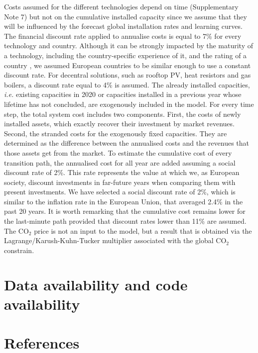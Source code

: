 \documentclass[5p]{elsarticle} %
\begin{document}
Costs assumed for the different technologies depend on time (Supplementary Note 7) but not on the cumulative installed capacity since we assume that they will be influenced by the forecast global installation rates and learning curves. The financial discount rate applied to annualise costs is equal to 7\% for every technology and country. Although it can be strongly impacted by the maturity of a technology, including the country-specific experience of it, and the rating of a country \cite{Egli_2019}, we assumed European countries to be similar enough to use a constant discount rate. For decentral solutions, such as rooftop PV, heat resistors and gas boilers, a discount rate equal to 4\% is assumed. The already installed capacities, \textit{i.e.} existing capacities in 2020 or capacities installed in a previous year whose lifetime has not concluded, are exogenously included in the model. For every time step, the total system cost includes two components. First, the costs of newly installed assets, which exactly recover their investment by market revenues. Second, the stranded costs for the exogenously fixed capacities. They are determined as the difference between the annualised costs and the revenues that those assets get from the market.  To estimate the cumulative cost of every transition path, the annualised cost for all year are added assuming a social discount rate of 2\%. This rate represents the value at which we, as European society, discount investments in far-future years when comparing them with present investments. We have selected a social discount rate of 2\%, which is similar to the inflation rate in the European Union, that averaged 2.4\% in the past 20 years. It is worth remarking that the cumulative cost remains lower for the last-minute path provided that discount rates lower than 11\% are assumed. The CO$_2$ price is not an input to the model, but a result that is obtained via the Lagrange/Karush-Kuhn-Tucker multiplier associated with the global CO$_2$ constrain. 

\section{Data availability and code availability}

\section{References}

\end{document}
